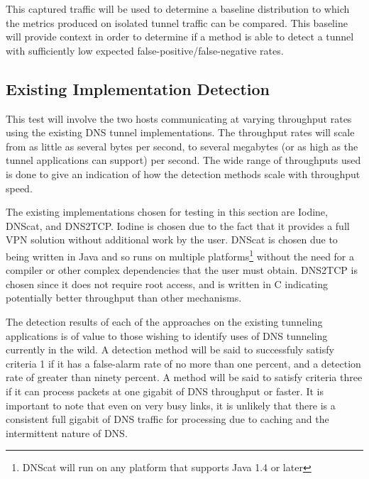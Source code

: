 \documentclass[12pt]{report}
\theoremstyle{remark}
\theoremstyle{definition}
\theoremstyle{definition}
\theoremstyle{definition}
\begin{document}
This captured traffic will be used to determine a baseline distribution to which the metrics produced on isolated tunnel traffic can be compared. This baseline will provide context in order to determine if a method is able to detect a tunnel with sufficiently low expected false-positive/false-negative rates.


\subsection{Existing Implementation Detection}
\label{test-existing}
This test
will involve the two hosts communicating at varying throughput rates using the
existing DNS tunnel implementations. The throughput rates will scale from as
little as several bytes per second, to several megabytes (or as high as the
tunnel applications can support) per second. The wide range of throughputs used
is done to give an indication of how the detection methods scale with throughput
speed.

The existing implementations chosen for testing in this section are
Iodine\cite{iodinesrc}, DNScat\cite{dnscatsrc}, and DNS2TCP\cite{dns2tcpsrc}.
Iodine is chosen due to the fact that it provides a full VPN solution without
additional work by the user. DNScat is chosen due to being written in Java and
so runs on multiple platforms\footnote{DNScat will run on any platform that
supports Java 1.4 or later\cite{dnscatsrc}} without the need for a compiler or
other complex dependencies that the user must obtain. DNS2TCP is chosen since it
does not require root access, and is written in C indicating potentially better
throughput than other mechanisms.

The detection results of each of the approaches on the existing tunneling
applications is of value to those wishing to identify uses of DNS tunneling
currently in the wild. A detection method will be said to successfuly satisfy
criteria 1 if it has a false-alarm rate of no more than one percent, and a
detection rate of greater than ninety percent. A method will be said to satisfy
criteria three if it can process packets at one gigabit of DNS throughput or
faster. It is important to note that even on very busy links, it is unlikely
that there is a consistent full gigabit of DNS traffic for processing due to
caching and the intermittent nature of DNS.
\end{document}

